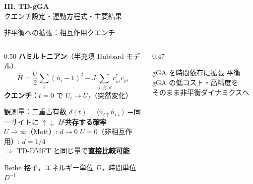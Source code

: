 \documentclass[12pt,aspectratio=169]{beamer}
\begin{document}
\begin{frame}[plain]
  \vfill
  \centering
  {\Large\textbf{III. TD-gGA}}\\[8pt]
  {\small クエンチ設定・運動方程式・主要結果}
  \vfill
\end{frame}

\begin{frame}[shrink=3]{非平衡への拡張：相互作用クエンチ}
  \begin{columns}[T]
    \begin{column}{0.50\textwidth}
      \textbf{ハミルトニアン}（半充填 Hubbard モデル）
      \begin{equation*}
        \hat{H} = \frac{U}{2}\sum_i (\hat{n}_i-1)^2
                  - J\!\sum_{\langle i,j\rangle,\sigma} c^\dagger_{i\sigma}c_{j\sigma}
      \end{equation*}
      \textbf{クエンチ：}$t=0$ で $U_i \to U_f$（突然変化）

      \medskip
      \begin{alertblock}{観測量：二重占有数}
        $d(t)=\langle \hat{n}_{i\uparrow}\hat{n}_{i\downarrow}\rangle$
        ＝同一サイトに $\uparrow\downarrow$ が\textbf{共存する確率}\\[2pt]
        {\small $U\to\infty$（Mott）: $d\to 0$\quad
                $U=0$（非相互作用）: $d=1/4$}\\[2pt]
        $\Rightarrow$ TD-DMFT と同じ量で\textbf{直接比較可能}
      \end{alertblock}

      \smallskip
      {\small Bethe 格子，エネルギー単位 $D$，時間単位 $D^{-1}$}
    \end{column}

    \begin{column}{0.47\textwidth}
      \centering

      \smallskip
      \begin{block}{\small gGA を時間依存に拡張}
        \small
        平衡 gGA の低コスト・高精度を\\
        そのまま非平衡ダイナミクスへ
      \end{block}
    \end{column}
  \end{columns}
\end{frame}
\end{document}
